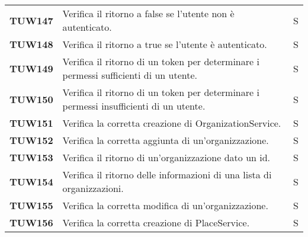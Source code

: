 \documentclass[../../piano-di-qualifica.tex]{subfiles}
\begin{document}
\begin{longtable}[H]{>{\centering\bfseries}m{3cm} >{}m{10cm} >{\centering\arraybackslash}m{3cm}}
  TUW147             & Verifica il ritorno a false se l'utente non è autenticato.                                                          & S                             \\

  TUW148             & Verifica il ritorno a true se l'utente è autenticato.                                                               & S                             \\

  TUW149             & Verifica il ritorno di un token per determinare i permessi sufficienti di un utente.                                & S                             \\

  TUW150             & Verifica il ritorno di un token per determinare i permessi insufficienti di un utente.                              & S                             \\



  TUW151             & Verifica la corretta creazione di OrganizationService.                                                              & S                             \\

  TUW152             & Verifica la corretta aggiunta di un'organizzazione.                                                                 & S                             \\

  TUW153             & Verifica il ritorno di un'organizzazione dato un id.                                                                & S                             \\

  TUW154             & Verifica il ritorno delle informazioni di una lista di organizzazioni.                                              & S                             \\

  TUW155             & Verifica la corretta modifica di un'organizzazione.                                                                 & S                             \\

  TUW156             & Verifica la corretta creazione di PlaceService.                                                                     & S                             \\


\end{longtable}
\end{document}
